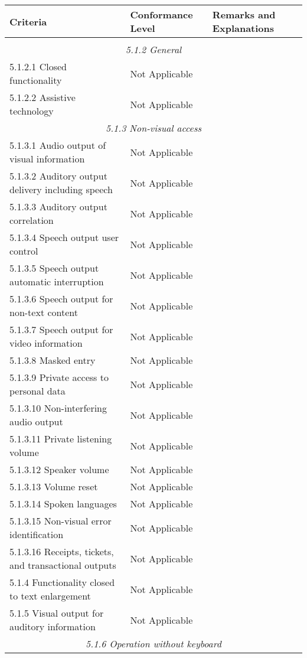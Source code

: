 \documentclass{report}
\begin{document}
\begin{longtable}{p{}<{\RaggedRight}p{}<{\RaggedRight}p{}<{\RaggedRight}}
  \toprule
  Criteria & Conformance Level & Remarks and Explanations \\
  \midrule
  \endhead
  \bottomrule
  \endfoot
  \multicolumn{3}{c}{\bfseries 5.1 Closed functionality}\\*
  \multicolumn{3}{c}{\itshape 5.1.2 General}\\*
  5.1.2.1 Closed functionality & Not Applicable\\
  5.1.2.2 Assistive technology & Not Applicable \\
  \multicolumn{3}{c}{\itshape 5.1.3 Non-visual access}\\*
  5.1.3.1 Audio output of visual information & Not Applicable\\
  5.1.3.2 Auditory output delivery including speech & Not Applicable\\
  5.1.3.3 Auditory output correlation & Not Applicable\\
  5.1.3.4 Speech output user control & Not Applicable\\
  5.1.3.5 Speech output automatic interruption & Not Applicable\\
  5.1.3.6 Speech output for non-text content & Not Applicable\\
  5.1.3.7 Speech output for video information & Not Applicable\\
  5.1.3.8 Masked entry & Not Applicable\\
  5.1.3.9 Private access to personal data & Not Applicable\\
  5.1.3.10 Non-interfering audio output & Not Applicable\\
  5.1.3.11 Private listening volume & Not Applicable\\
  5.1.3.12 Speaker volume & Not Applicable\\
  5.1.3.13 Volume reset & Not Applicable\\
  5.1.3.14 Spoken languages & Not Applicable\\
  5.1.3.15 Non-visual error identification & Not Applicable\\
  5.1.3.16 Receipts, tickets, and transactional outputs & Not Applicable\\
  5.1.4 Functionality closed to text enlargement & Not Applicable\\
  5.1.5 Visual output for auditory information & Not Applicable\\
  \multicolumn{3}{c}{\itshape 5.1.6 Operation without keyboard
}
\end{longtable}
\end{document}
